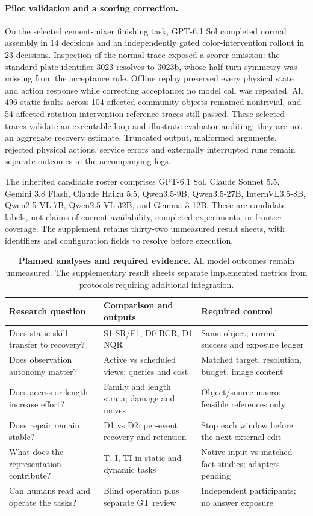 \documentclass[10pt,twocolumn,letterpaper]{article}
\begin{document}
\paragraph{Pilot validation and a scoring correction.}
On the selected cement-mixer finishing task, GPT-6.1 Sol completed normal assembly in 14 decisions and an independently gated color-intervention rollout in 23 decisions. Inspection of the normal trace exposed a scorer omission: the standard plate identifier 3023 resolves to 3023b, whose half-turn symmetry was missing from the acceptance rule. Offline replay preserved every physical state and action response while correcting acceptance; no model call was repeated. All 496 static faults across 104 affected community objects remained nontrivial, and 54 affected rotation-intervention reference traces still passed. These selected traces validate an executable loop and illustrate evaluator auditing; they are not an aggregate recovery estimate. Truncated output, malformed arguments, rejected physical actions, service errors and externally interrupted runs remain separate outcomes in the accompanying logs.

The inherited candidate roster comprises GPT-6.1 Sol, Claude Sonnet 5.5, Gemini 3.8 Flash, Claude Haiku 5.5, Qwen3.5-9B, Qwen3.5-27B, InternVL3.5-8B, Qwen2.5-VL-7B, Qwen2.5-VL-32B, and Gemma 3-12B. These are candidate labels, not claims of current availability, completed experiments, or frontier coverage. The supplement retains thirty-two unmeasured result sheets, with identifiers and configuration fields to resolve before execution.

\begin{table}[t]\centering\small
\caption{\textbf{Planned analyses and required evidence.} All model outcomes remain unmeasured. The supplementary result sheets separate implemented metrics from protocols requiring additional integration.}
\label{tab:plan}
\begin{tabularx}{\textwidth}{@{}YYY@{}}\toprule
Research question & Comparison and outputs & Required control\\\midrule
Does static skill transfer to recovery? & S1 SR/F1, D0 BCR, D1 NQR & Same object; normal success and exposure ledger\\
Does observation autonomy matter? & Active vs scheduled views; queries and cost & Matched target, resolution, budget, image content\\
Does access or length increase effort? & Family and length strata; damage and moves & Object/source macro; feasible references only\\
Does repair remain stable? & D1 vs D2; per-event recovery and retention & Stop each window before the next external edit\\
What does the representation contribute? & T, I, TI in static and dynamic tasks & Native-input vs matched-fact studies; adapters pending\\
Can humans read and operate the tasks? & Blind operation plus separate GT review & Independent participants; no answer exposure\\\bottomrule
\end{tabularx}\end{table}
\end{document}
